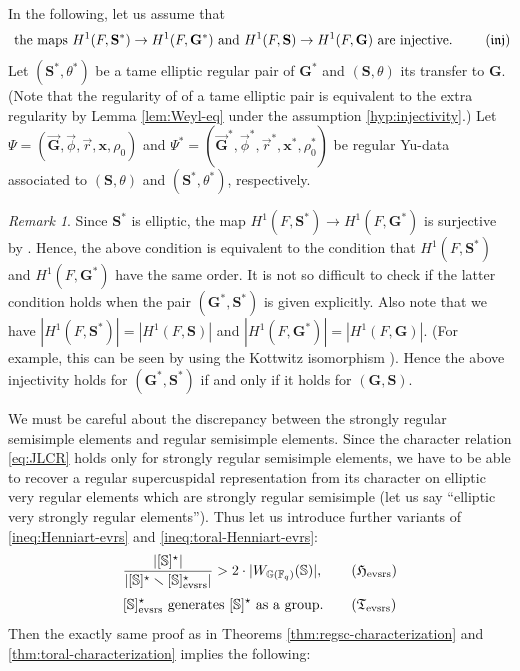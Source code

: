 \documentclass{amsart}
\newcommand{\evsrs}{\mathrm{evsrs}}
\newcommand{\x}{\mathbf{x}}
\newcommand{\F}{\mathbb{F}}
\newcommand{\bbS}{\mathbb{S}}
\newcommand{\bbG}{\mathbb{G}}
\newcommand{\bfG}{\mathbf{G}}
\newcommand{\bfS}{\mathbf{S}}
\theoremstyle{plain}
\theoremstyle{definition}
\theoremstyle{remark}
\newtheorem{rem}[thm]{Remark}
\theoremstyle{theorem}
\begin{document}
In the following, let us assume that 
\[\label{hyp:injectivity}
\text{
the maps $H^{1}(F,\bfS^{\ast})\rightarrow H^{1}(F,\bfG^{\ast})$ and $H^{1}(F,\bfS)\rightarrow H^{1}(F,\bfG)$ are injective.
}
\tag{$\mathfrak{inj}$}
\]
Let $(\bfS^{\ast},\theta^{\ast})$ be a tame elliptic regular pair of $\bfG^{\ast}$ and $(\bfS,\theta)$ its transfer to $\bfG$.
(Note that the regularity of of a tame elliptic pair is equivalent to the extra regularity by Lemma \ref{lem:Weyl-eq} under the assumption \eqref{hyp:injectivity}.)
Let $\Psi=(\vec{\bfG},\vec{\phi},\vec{r},\x,\rho_{0})$ and $\Psi^{\ast}=(\vec{\bfG}^{\ast},\vec{\phi}^{\ast},\vec{r}^{\ast},\x^{\ast},\rho^{\ast}_{0})$ be regular Yu-data associated to $(\bfS,\theta)$ and $(\bfS^{\ast},\theta^{\ast})$, respectively.

\begin{rem}\label{rem:injectivity}
Since $\bfS^{\ast}$ is elliptic, the map $H^{1}(F,\bfS^{\ast})\rightarrow H^{1}(F,\bfG^{\ast})$ is surjective by \cite[10.2 Lemma]{Kot86}.
Hence, the above condition is equivalent to the condition that $H^{1}(F,\bfS^{\ast})$ and $H^{1}(F,\bfG^{\ast})$ have the same order.
It is not so difficult to check if the latter condition holds when the pair $(\bfG^{\ast},\bfS^{\ast})$ is given explicitly.
Also note that we have $|H^{1}(F,\bfS^{\ast})|=|H^{1}(F,\bfS)|$ and $|H^{1}(F,\bfG^{\ast})|=|H^{1}(F,\bfG)|$.
(For example, this can be seen by using the Kottwitz isomorphism \cite[1.2 Theorem]{Kot86}).
Hence the above injectivity holds for $(\bfG^{\ast},\bfS^{\ast})$ if and only if it holds for $(\bfG,\bfS)$.
\end{rem}

We must be careful about the discrepancy between the strongly regular semisimple elements and regular semisimple elements.
Since the character relation \eqref{eq:JLCR} holds only for strongly regular semisimple elements, we have to be able to recover a regular supercuspidal representation from its character on elliptic very regular elements which are strongly regular semisimple (let us say ``elliptic very strongly regular elements'').
Thus let us introduce further variants of \eqref{ineq:Henniart-evrs} and \eqref{ineq:toral-Henniart-evrs}:
\[\label{ineq:Henniart-evsrs}
\frac{|[\bbS]^{\star}|}{|[\bbS]^{\star} \smallsetminus [\bbS]^{\star}_{\evsrs}|} 
> 2\cdot|W_{\bbG(\F_{q})}(\bbS)|,
\tag{$\mathfrak{H}_{\evsrs}$}
\]
\[\label{ineq:toral-Henniart-evsrs}
\text{$[\bbS]^{\star}_{\evsrs}$ generates $[\bbS]^{\star}$ as a group.}
\tag{$\mathfrak{T}_{\evsrs}$}
\]
Then the exactly same proof as in Theorems \ref{thm:regsc-characterization} and \ref{thm:toral-characterization} implies the following:
\end{document}
